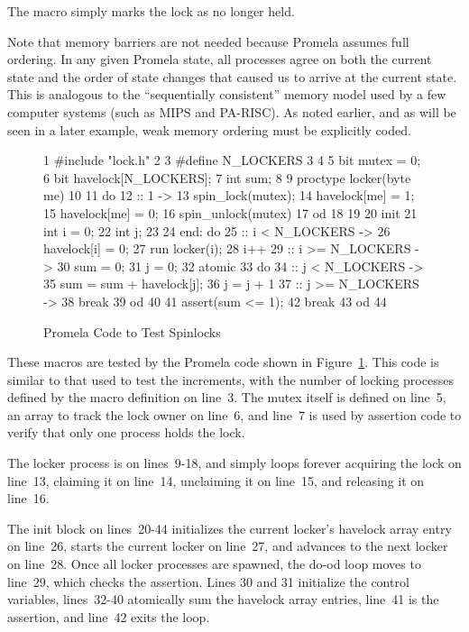 The  macro simply marks the lock as no
longer held.

Note that memory barriers are not needed because Promela assumes
full ordering.
In any given Promela state, all processes agree on both the current
state and the order of state changes that caused us to arrive at
the current state.
This is analogous to the ``sequentially consistent'' memory model
used by a few computer systems (such as MIPS and PA-RISC).
As noted earlier, and as will be seen in a later example,
weak memory ordering must be explicitly coded.

\begin{figure}[tb]
{ \scriptsize
\begin{verbbox}
  1 #include "lock.h"
  2
  3 #define N_LOCKERS 3
  4
  5 bit mutex = 0;
  6 bit havelock[N_LOCKERS];
  7 int sum;
  8
  9 proctype locker(byte me)
 10 {
 11   do
 12   :: 1 ->
 13     spin_lock(mutex);
 14     havelock[me] = 1;
 15     havelock[me] = 0;
 16     spin_unlock(mutex)
 17   od
 18 }
 19
 20 init {
 21   int i = 0;
 22   int j;
 23
 24 end:  do
 25   :: i < N_LOCKERS ->
 26     havelock[i] = 0;
 27     run locker(i);
 28     i++
 29   :: i >= N_LOCKERS ->
 30     sum = 0;
 31     j = 0;
 32     atomic {
 33       do
 34       :: j < N_LOCKERS ->
 35         sum = sum + havelock[j];
 36         j = j + 1
 37       :: j >= N_LOCKERS ->
 38         break
 39       od
 40     }
 41     assert(sum <= 1);
 42     break
 43   od
 44 }
\end{verbbox}
}
\centering
\theverbbox
\caption{Promela Code to Test Spinlocks}
\label{fig:analysis:Promela Code to Test Spinlocks}
\end{figure}

These macros are tested by the Promela code shown in
Figure~\ref{fig:analysis:Promela Code to Test Spinlocks}.
This code is similar to that used to test the increments,
with the number of locking processes defined by the 
macro definition on line~3.
The mutex itself is defined on line~5, an array to track the lock owner
on line~6, and line~7 is used by assertion
code to verify that only one process holds the lock.

The locker process is on lines~9-18, and simply loops forever
acquiring the lock on line~13, claiming it on line~14,
unclaiming it on line~15, and releasing it on line~16.

The init block on lines~20-44 initializes the current locker's
havelock array entry on line~26, starts the current locker on
line~27, and advances to the next locker on line~28.
Once all locker processes are spawned, the do-od loop
moves to line~29, which checks the assertion.
Lines 30 and 31 initialize the control variables,
lines~32-40 atomically sum the havelock array entries,
line~41 is the assertion, and line~42 exits the loop.

